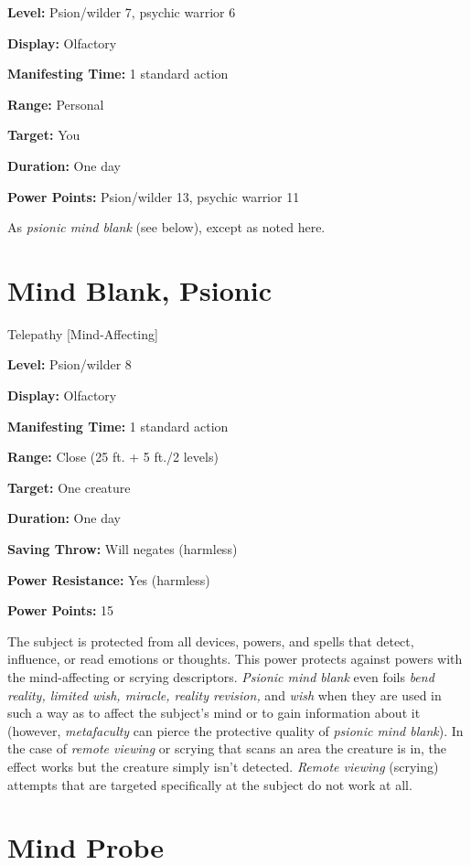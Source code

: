 \documentclass{article}
\begin{document}
\textbf{Level:} Psion/wilder 7, psychic warrior 6

\textbf{Display:} Olfactory

\textbf{Manifesting Time:} 1 standard action

\textbf{Range:} Personal

\textbf{Target:} You

\textbf{Duration:} One day

\textbf{Power Points:} Psion/wilder 13, psychic warrior 11

As \textit{psionic mind blank }(see below), except as noted here.

\vspace{12pt}
\section*{Mind Blank, Psionic}

Telepathy [Mind-Affecting]

\textbf{Level:} Psion/wilder 8

\textbf{Display:} Olfactory

\textbf{Manifesting Time:} 1 standard action

\textbf{Range:} Close (25 ft. + 5 ft./2 levels)

\textbf{Target:} One creature

\textbf{Duration:} One day

\textbf{Saving Throw:} Will negates (harmless)

\textbf{Power Resistance:} Yes (harmless)

\textbf{Power Points:} 15

The subject is protected from all devices, powers, and spells that detect, influence, 
or read emotions or thoughts. This power protects against powers with the mind-affecting 
or scrying descriptors. \textit{Psionic mind blank }even foils \textit{bend reality, 
limited wish, miracle, reality revision, }and \textit{wish }when they are used 
in such a way as to affect the subject's mind or to gain information about it (however, 
\textit{metafaculty }can pierce the protective quality of \textit{psionic mind 
blank}). In the case of \textit{remote viewing }or scrying that scans an area the 
creature is in, the effect works but the creature simply isn't detected. \textit{Remote 
viewing }(scrying) attempts that are targeted specifically at the subject do not 
work at all.

\vspace{12pt}
\section*{Mind Probe}
\end{document}
